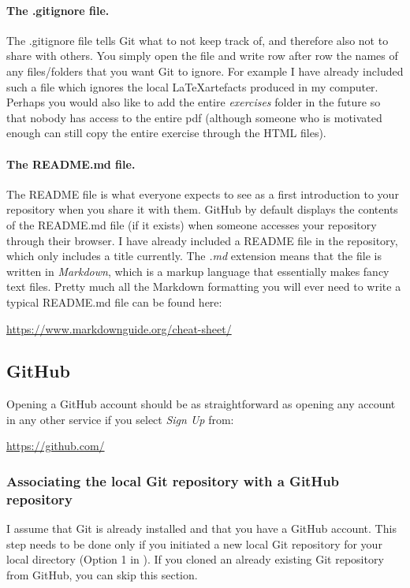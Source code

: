 \documentclass[a4paper,10pt]{article}
\begin{document}
\paragraph{The .gitignore file.} The .gitignore file tells Git what to not keep track of, and therefore also not to share with others. You simply open the file and write row after row the names of any files/folders that you want Git to ignore. For example I have already included such a file which ignores the local \LaTeX artefacts produced in my computer. Perhaps you would also like to add the entire \emph{exercises} folder in the future so that nobody has access to the entire pdf (although someone who is motivated enough can still copy the entire exercise through the HTML files).

\paragraph{The README.md file.} The README file is what everyone expects to see as a first introduction to your repository when you share it with them. GitHub by default displays the contents of the README.md file (if it exists) when someone accesses your repository through their browser. I have already included a README file in the repository, which only includes a title currently. The \emph{.md} extension means that the file is written in \emph{Markdown}, which is a markup language that essentially makes fancy text files. Pretty much all the Markdown formatting you will ever need to write a typical README.md file can be found here:

\url{https://www.markdownguide.org/cheat-sheet/}


\subsection{GitHub}

Opening a GitHub account should be as straightforward as opening any account in any other service if you select \emph{Sign Up} from: 

\url{https://github.com/}


\subsubsection{Associating the local Git repository with a GitHub repository}

I assume that Git is already installed and that you have a GitHub account. This step needs to be done only if you initiated a new local Git repository for your local directory (Option 1 in ). If you cloned an already existing Git repository from GitHub, you can skip this section.
\end{document}
